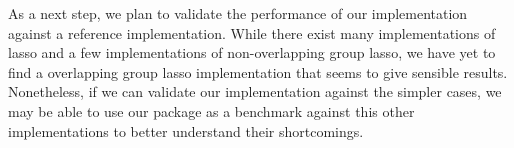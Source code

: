 \documentclass{article}
\begin{document}
As a next step, we plan to validate the performance of our implementation against a reference implementation.
While there exist many implementations of lasso and a few implementations of non-overlapping group lasso, we have yet to find a overlapping group lasso implementation that seems to give sensible results.
Nonetheless, if we can validate our implementation against the simpler cases, we may be able to use our package as a benchmark against this other implementations to better understand their shortcomings.

\clearpage
\printbibliography
\end{document}
